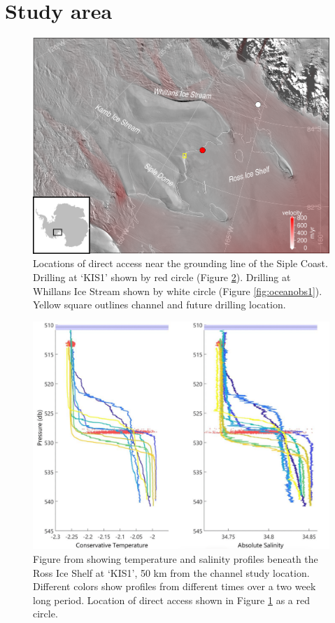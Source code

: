 \section{Study area} \label{sec:conditions}

\begin{figure}[!ht]
\centering
    \includegraphics[width=1\textwidth]{chapters/4/drilling_locations_small.png}
    \caption[Drilling locations]{Locations of direct access near the grounding line of the Siple Coast. Drilling at `KIS1' shown by red circle (Figure \ref{fig:oceanobs2}). Drilling at Whillans Ice Stream shown by white circle (Figure \ref{fig:oceanobs1}). Yellow square outlines channel and future drilling location.}
    \label{fig:map_drill}
\end{figure}

\begin{figure}[!ht]
\centering
    \includegraphics[width=1\textwidth]{chapters/4/oceanobs2.jpg}
    \caption[KIS1 observations]{Figure from \cite{robinson2020ice} showing temperature and salinity profiles beneath the Ross Ice Shelf at `KIS1', 50 km from the channel study location. Different colors show profiles from different times over a two week long period. Location of direct access shown in Figure \ref{fig:map_drill} as a red circle.}
    \label{fig:oceanobs2}
\end{figure}

